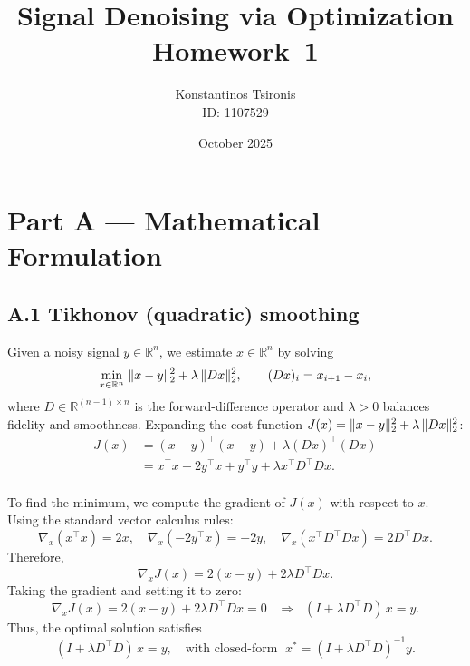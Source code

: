 \documentclass[11pt,a4paper]{article}
\title{\textbf{Signal Denoising via Optimization}\\\large Homework~1}
\author{Konstantinos Tsironis \\ ID: 1107529}
\date{October 2025}
\DeclarePairedDelimiter{\norm}{\lVert}{\rVert}
\newcommand{\R}{\mathbb{R}}
\begin{document}
\maketitle
\vspace{-1em}

\section*{Part A — Mathematical Formulation}
\subsection*{A.1 Tikhonov (quadratic) smoothing}
Given a noisy signal \(y\in\R^n\), we estimate \(x\in\R^n\) by solving
\begin{equation}
\min_{x\in\R^n} \; \norm{x-y}_2^2 + \lambda\, \norm{Dx}_2^2, \qquad (Dx)_i = x_{i+1}-x_i,
\label{eq:l2_obj}
\end{equation}
where \(D\in\R^{(n-1)\times n}\) is the forward-difference operator and \(\lambda>0\) balances fidelity and smoothness. Expanding the cost function \(J(x)=\norm{x-y}_2^2+\lambda\,\norm{Dx}_2^2\):
\begin{align}
J(x) &= (x-y)^\top(x-y) + \lambda (Dx)^\top(Dx) \\
     &= x^\top x - 2y^\top x + y^\top y + \lambda x^\top D^\top D x.
\end{align}
\\
To find the minimum, we compute the gradient of $J(x)$ with respect to $x$.
Using the standard vector calculus rules:
\[
\nabla_x(x^\top x) = 2x, \quad
\nabla_x(-2y^\top x) = -2y, \quad
\nabla_x(x^\top D^\top D x) = 2D^\top D x.
\]
Therefore,
\[
\nabla_x J(x) = 2(x - y) + 2\lambda D^\top D x.
\]
Taking the gradient and setting it to zero: 
\begin{equation}
\nabla_x J(x) = 2(x-y) + 2\lambda D^\top D x = 0 \;\;\;\Rightarrow\;\; (I + \lambda D^\top D)\,x = y.
\end{equation}
Thus, the optimal solution satisfies
\begin{equation}
(I + \lambda D^\top D)\,x = y,\quad \text{with closed-form }\; x^* = (I+\lambda D^\top D)^{-1}y.
\end{equation}
\end{document}
